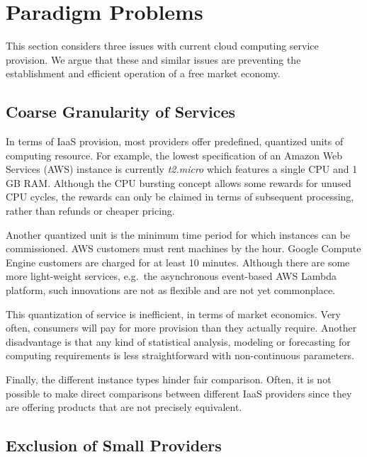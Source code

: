 \documentclass[conference,10pt]{IEEEtran}
\begin{document}

\section{Paradigm Problems}
\label{sec-probs}

This section considers three issues with current cloud computing service provision.
We argue that these and similar issues are preventing the establishment and efficient operation of a free market economy.



\subsection{Coarse Granularity of Services}

In terms of IaaS provision, most providers offer predefined, quantized units of computing resource. For example, the lowest specification of an Amazon Web Services (AWS) instance is currently \emph{t2.micro} which features a single CPU and 1 GB RAM. Although the CPU bursting concept allows some rewards for unused CPU cycles, the rewards can only be claimed in terms of subsequent processing, rather than refunds or cheaper pricing.  

Another quantized unit is the minimum time period for which instances can be commissioned. AWS customers must rent machines by the hour. Google Compute Engine customers are charged for at least 10 minutes.
Although there are some more light-weight services, e.g.\ the asynchronous event-based AWS Lambda platform, such innovations are not as flexible and are not yet commonplace.

This quantization of service is inefficient, in terms of market economics. Very often, consumers will pay for more provision than they actually require. Another disadvantage is that any kind of statistical analysis, modeling or forecasting for computing requirements is less straightforward with non-continuous parameters. 

Finally, the different instance types hinder fair comparison. Often, it is not possible to make direct comparisons between different IaaS providers since they are offering products that are not precisely equivalent.


\subsection{Exclusion of Small Providers}
\end{document}
